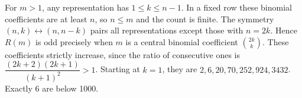 For $m>1$, any representation has $1\le k\le n-1$. In a fixed row these binomial coefficients are at least $n$, so $n\le m$ and the count is finite. The symmetry $(n,k)\leftrightarrow(n,n-k)$ pairs all representations except those with $n=2k$. Hence $R(m)$ is odd precisely when $m$ is a central binomial coefficient $\binom{2k}{k}$. These coefficients strictly increase, since the ratio of consecutive ones is $\dfrac{(2k+2)(2k+1)}{(k+1)^2}>1$. Starting at $k=1$, they are $2,6,20,70,252,924,3432$. Exactly $\boxed6$ are below 1000.
